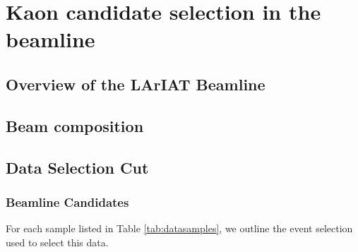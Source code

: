 
\section{Kaon candidate selection in the beamline}\label{sec:BeamlineSelection}
\subsection{Overview of the LArIAT Beamline}\label{sec:BeamlineOverview}

\subsection{Beam composition}\label{sec:G4BeamlineMC}



\subsection{Data Selection Cut}\label{sec:DataSelectionCut}
\subsubsection{Beamline Candidates}\label{sec:BeamlineCandidates}

For each sample listed in Table \ref{tab:datasamples}, we outline the event selection used to select this data.

